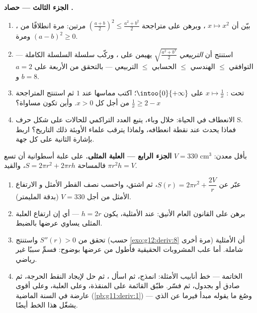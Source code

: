 \begin{problem}
\medskip
\noindent\textbf{الجزء الثالث --- حصاد .}
\begin{enumerate}[resume]
  \item بيّن أن $x \mapsto x^2$ ، وبرهن على
        متراجحة 
        $\left(\frac{a + b}{2}\right)^2 \leq
        \frac{a^2 + b^2}{2}$ مرتين: مرة انطلاقًا من ، ومرة
         $(a - b)^2 \geq 0$.
  \item استنتج أن \emph{ التربيعي}
        $\sqrt{\frac{a^2 + b^2}{2}}$ يهيمن على ، وركّب سلسلة السلسلة الكاملة ---
        التوافقي $\leq$ الهندسي $\leq$ الحسابي $\leq$
        التربيعي --- بالتحقق من الأربعة على $a = 2$ و $b = 8$.
  \item {} تحت :  $x \mapsto \frac1x$ 
        على $\intoo{0}{+\infty}$؛ اكتب مماسها عند $1$ ثم
        استنتج المتراجحة
        $\frac1x \geq 2 - x$ من أجل كل $x > 0$. وأين تكون
        مساواة؟
  \item الانعطاف في الحياة: خلال وباء، يتبع
        العدد التراكمي للحالات  على شكل حرف S. فماذا
        يحدث عند نقطة انعطافه، ولماذا يترقب علماء الأوبئة ذلك
        التاريخ؟ اربط بإشارة  الثانية على كل جهة.
\end{enumerate}

\medskip
\noindent\textbf{الجزء الرابع --- العلبة المثلى.}
على علبة أسطوانية أن تسع $V = 330$ cm$^3$ بأقل
معدن: فالمساحة $S = 2\pi r^2 + 2\pi r h$، والقيد
$\pi r^2 h = V$.
\begin{enumerate}[resume]
  \item عبّر عن $S(r) = 2\pi r^2 + \dfrac{2V}{r}$، ثم
        اشتق، واحسب نصف القطر الأمثل و
        الارتفاع الأمثل من أجل $V = 330$ (بدقة المليمتر).
  \item برهن على القانون العام الأنيق: عند الأمثلية، يكون
        $h = 2r$ --- أي إن ارتفاع العلبة المثلى يساوي
        عرضها بالضبط.
  \item تحقق من $S''(r) > 0$ واستنتج (حسب \cref{exo:g12:deriv:8}
        مرة أخرى) أن الأمثلية شاملة. أما علب المشروبات
        الحقيقية فأطول من عرضها بوضوح:
        فسمِّ سببًا غير رياضي.
  \item الخاتمة --- خط أنابيب الأمثلة: انمذج، ثم اسأل
        ، ثم حل لإيجاد النقط الحرجة، ثم صادق 
        أو بجدول، ثم فسّر. طبّق القائمة على المنقذة،
        وعلى العلبة، وعلى أقوى عارضة في السنة الماضية
        (\cref{pb:g11:deriv:1}) --- وصُغ ما يقوله مبدأ فيرما
        عن الذي يشغّل هذا الخط أيضًا.
\end{enumerate}
\end{problem}
